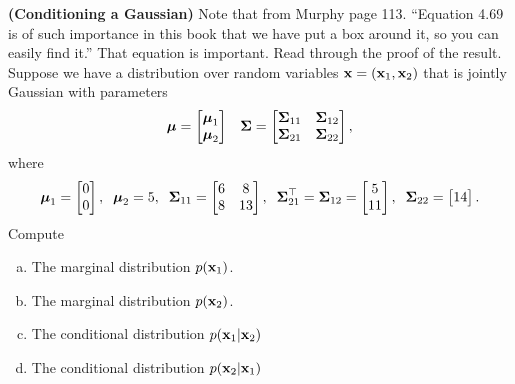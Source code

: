 \documentclass[12pt,letterpaper,fleqn]{hmcpset}
\begin{document}
\begin{problem}[1]
\textbf{(Conditioning a Gaussian)} Note that from Murphy page 113. ``Equation 4.69
is of such importance in this book that we have put a box around it, so you can easily
find it.'' That equation is important. Read through the proof of the result.
Suppose we have a distribution over random variables ${\bf x} = ({\bf x}_1, {\bf x}_2)$ that is
jointly Gaussian with parameters
\[
    \hbox{\boldmath$\mu$} = \begin{bmatrix} \hbox{\boldmath$\mu$}_1\\\hbox{\boldmath$\mu$}_2 \end{bmatrix}\;\;\; \hbox{\boldmath$\Sigma$} = \begin{bmatrix} \hbox{\boldmath$\Sigma$}_{11}&\hbox{\boldmath$\Sigma$}_{12}\\\hbox{\boldmath$\Sigma$}_{21}&\hbox{\boldmath$\Sigma$}_{22} \end{bmatrix},
\]
where
\[
    \hbox{\boldmath$\mu$}_1 = \begin{bmatrix} 0\\0 \end{bmatrix}, \;\; \hbox{\boldmath$\mu$}_2 = 5, \;\; \hbox{\boldmath$\Sigma$}_{11} = \begin{bmatrix} 6 & 8\\ 8 & 13 \end{bmatrix}, \;\; \hbox{\boldmath$\Sigma$}_{21}^\top = \hbox{\boldmath$\Sigma$}_{12} = \begin{bmatrix} 5\\11 \end{bmatrix}, \;\; \hbox{\boldmath$\Sigma$}_{22} = \begin{bmatrix} 14 \end{bmatrix}.
\]
Compute
\begin{enumerate}[(a)]
    \item The marginal distribution $p({\bf x}_1)$.
    \item The marginal distribution $p({\bf x}_2)$.
    \item The conditional distribution $p({\bf x}_1 | {\bf x}_2)$
    \item The conditional distribution $p({\bf x}_2 | {\bf x}_1)$
\end{enumerate}

\end{problem}
\end{document}
